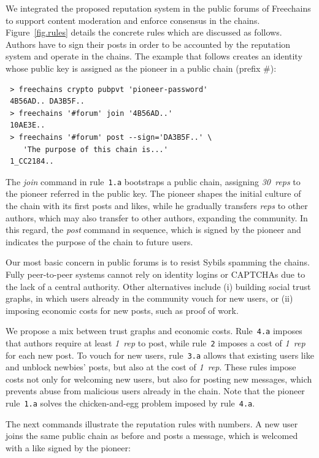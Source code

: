\documentclass[10pt,journal,compsoc]{IEEEtran}
\newcommand{\FC}       {Freechains\xspace}
\newcommand{\reps}     {\emph{reps}\xspace}
\newcommand{\onerep}   {\emph{1~rep}\xspace}
\newcommand{\nreps}[1] {\emph{#1~reps\xspace}}
\begin{document}
We integrated the proposed reputation system in the public forums of \FC to
support content moderation and enforce consensus in the chains.
Figure~\ref{fig.rules} details the concrete rules which are discussed as
follows.
Authors have to sign their posts in order to be accounted by the reputation
system and operate in the chains.
The example that follows creates an identity whose public key is assigned as
the pioneer in a public chain (prefix $\#$):

{\footnotesize
\begin{verbatim}
 > freechains crypto pubpvt 'pioneer-password'
 4B56AD.. DA3B5F..
 > freechains '#forum' join '4B56AD..'
 10AE3E..
 > freechains '#forum' post --sign='DA3B5F..' \
    'The purpose of this chain is...'
 1_CC2184..
\end{verbatim}
}

The \emph{join} command in rule~\texttt{1.a} bootstraps a public chain,
assigning \nreps{30} to the pioneer referred in the public key.
The pioneer shapes the initial culture of the chain with its first posts and
likes, while he gradually transfers \reps to other authors, which may also
transfer to other authors, expanding the community.
%
In this regard, the \emph{post} command in sequence, which is signed by the
pioneer and indicates the purpose of the chain to future users.

Our most basic concern in public forums is to resist Sybils spamming the
chains.
Fully peer-to-peer systems cannot rely on identity logins or CAPTCHAs due
to the lack of a central authority.
Other alternatives include (i) building social trust graphs, in which users
already in the community vouch for new users, or (ii) imposing economic costs
for new posts, such as proof of work.

We propose a mix between trust graphs and economic costs.
Rule~\texttt{4.a} imposes that authors require at least \onerep to post, while
rule~\texttt{2} imposes a cost of \onerep for each new post.
To vouch for new users, rule~\texttt{3.a} allows that existing users like and
unblock newbies' posts, but also at the cost of \onerep.
These rules impose costs not only for welcoming new users, but also for posting
new messages, which prevents abuse from malicious users already in the chain.
%
Note that the pioneer rule~\texttt{1.a} solves the chicken-and-egg problem
imposed by rule~\texttt{4.a}.

The next commands illustrate the reputation rules with numbers.
A new user joins the same public chain as before and posts a message, which is
welcomed with a like signed by the pioneer:
\end{document}
